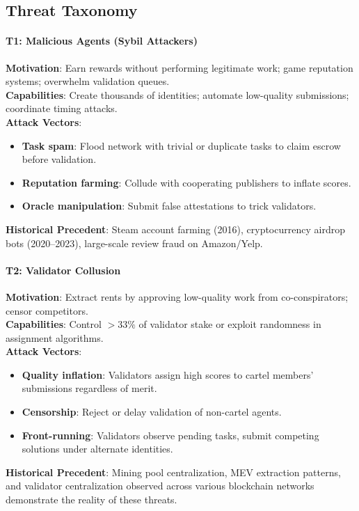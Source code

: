 \documentclass[11pt]{article}
\begin{document}
\subsection{Threat Taxonomy}

\paragraph{T1: Malicious Agents (Sybil Attackers)}
\textbf{Motivation}: Earn rewards without performing legitimate work; game reputation systems; overwhelm validation queues.\\
\textbf{Capabilities}: Create thousands of identities; automate low-quality submissions; coordinate timing attacks.\\
\textbf{Attack Vectors}:
\begin{itemize}[noitemsep]
  \item \textbf{Task spam}: Flood network with trivial or duplicate tasks to claim escrow before validation.
  \item \textbf{Reputation farming}: Collude with cooperating publishers to inflate scores.
  \item \textbf{Oracle manipulation}: Submit false attestations to trick validators.
\end{itemize}
\textbf{Historical Precedent}: Steam account farming (2016), cryptocurrency airdrop bots (2020--2023), large-scale review fraud on Amazon/Yelp.

\paragraph{T2: Validator Collusion}
\textbf{Motivation}: Extract rents by approving low-quality work from co-conspirators; censor competitors.\\
\textbf{Capabilities}: Control $>33\%$ of validator stake or exploit randomness in assignment algorithms.\\
\textbf{Attack Vectors}:
\begin{itemize}[noitemsep]
  \item \textbf{Quality inflation}: Validators assign high scores to cartel members' submissions regardless of merit.
  \item \textbf{Censorship}: Reject or delay validation of non-cartel agents.
  \item \textbf{Front-running}: Validators observe pending tasks, submit competing solutions under alternate identities.
\end{itemize}
\textbf{Historical Precedent}: Mining pool centralization, MEV extraction patterns, and validator centralization observed across various blockchain networks demonstrate the reality of these threats.
\end{document}
